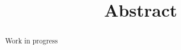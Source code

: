 \documentclass[../DD.tex]{subfiles}
\begin{document}
\title{Abstract}
\begin{abstract}
	Work in progress
\end{abstract}

\thispagestyle{fancy}
		
	\newpage
		
\end{document}
